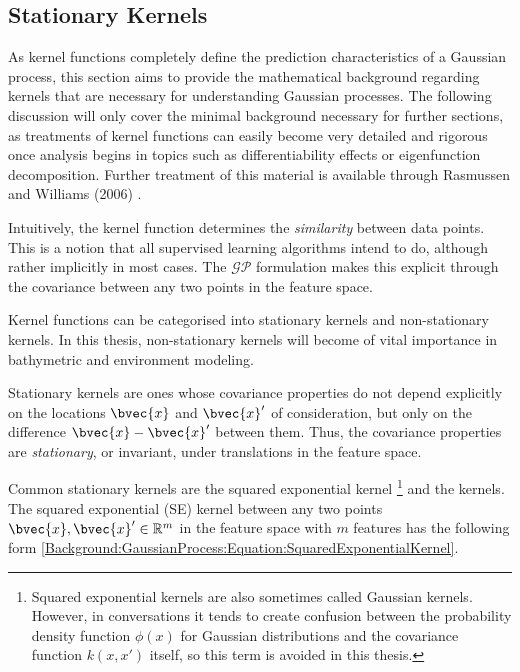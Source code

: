 		\subsection{Stationary Kernels}
		
			As kernel functions completely define the prediction characteristics of a Gaussian process, this section aims to provide the mathematical background regarding kernels that are necessary for understanding Gaussian processes. The following discussion will only cover the minimal background necessary for further sections, as treatments of kernel functions can easily become very detailed and rigorous once analysis begins in topics such as differentiability effects or eigenfunction decomposition. Further treatment of this material is available through Rasmussen and Williams (2006) \cite{GaussianProcessForMachineLearning}. 
			
			Intuitively, the kernel function determines the \textit{similarity} between data points. This is a notion that all supervised learning algorithms intend to do, although rather implicitly in most cases. The $\mathcal{GP}$ formulation makes this explicit through the covariance between any two points in the feature space.
			
			Kernel functions can be categorised into stationary kernels and non-stationary kernels. In this thesis, non-stationary kernels will become of vital importance in bathymetric and environment modeling. 
			
			Stationary kernels are ones whose covariance properties do not depend explicitly on the locations $\bvec{x}$ and $\bvec{x}'$ of consideration, but only on the difference $\bvec{x} - \bvec{x}'$ between them. Thus, the covariance properties are \textit{stationary}, or invariant, under translations in the feature space.
			
			Common stationary kernels are the squared exponential kernel \footnote{Squared exponential kernels are also sometimes called Gaussian kernels. However, in conversations it tends to create confusion between the probability density function $\phi(x)$ for Gaussian distributions and the covariance function $k(x, x')$ itself, so this term is avoided in this thesis.} and the \matern kernels. The squared exponential (SE) kernel between any two points $\bvec{x}, \bvec{x}' \in \mathbb{R}^{m}$ in the feature space with $m$ features has the following form \eqref{Background:GaussianProcess:Equation:SquaredExponentialKernel}.
			
